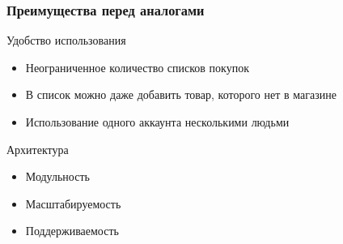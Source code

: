 \documentclass{beamer}
\begin{document}
\begin{frame}
\frametitle{Преимущества перед аналогами}
	\begin{multicols}{2}
        Удобство использования
        \bigskip
        \begin{itemize}
            \item Неограниченное количество списков покупок
            \item В список можно даже добавить товар, которого нет в магазине
            \item Использование одного аккаунта несколькими людьми
        \end{itemize}
	\columnbreak
        Архитектура
        \bigskip
	\begin{itemize}
		\item Модульность
		\item Масштабируемость
		\item Поддерживаемость
	\end{itemize}
	\end{multicols}
\end{frame}
\end{document}
